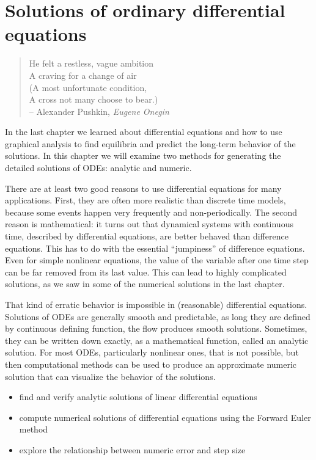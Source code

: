 \documentclass[
  letterpaper,
  DIV=11,
  numbers=noendperiod]{scrreprt}
\begin{document}

\hypertarget{solutions-of-ordinary-differential-equations}{%
\chapter{Solutions of ordinary differential
equations}\label{solutions-of-ordinary-differential-equations}}

\begin{quote}
He felt a restless, vague ambition\\
A craving for a change of air\\
(A most unfortunate condition,\\
A cross not many choose to bear.)\\
-- Alexander Pushkin, \emph{Eugene Onegin}
\end{quote}

In the last chapter we learned about differential equations and how to
use graphical analysis to find equilibria and predict the long-term
behavior of the solutions. In this chapter we will examine two methods
for generating the detailed solutions of ODEs: analytic and numeric.

There are at least two good reasons to use differential equations for
many applications. First, they are often more realistic than discrete
time models, because some events happen very frequently and
non-periodically. The second reason is mathematical: it turns out that
dynamical systems with continuous time, described by differential
equations, are better behaved than difference equations. This has to do
with the essential ``jumpiness'' of difference equations. Even for
simple nonlinear equations, the value of the variable after one time
step can be far removed from its last value. This can lead to highly
complicated solutions, as we saw in some of the numerical solutions in
the last chapter.

That kind of erratic behavior is impossible in (reasonable) differential
equations. Solutions of ODEs are generally smooth and predictable, as
long they are defined by continuous defining function, the flow produces
smooth solutions. Sometimes, they can be written down exactly, as a
mathematical function, called an analytic solution. For most ODEs,
particularly nonlinear ones, that is not possible, but then
computational methods can be used to produce an approximate numeric
solution that can visualize the behavior of the solutions.

\begin{itemize}
\item
  find and verify analytic solutions of linear differential equations
\item
  compute numerical solutions of differential equations using the
  Forward Euler method
\item
  explore the relationship between numeric error and step size
\end{itemize}
\end{document}
